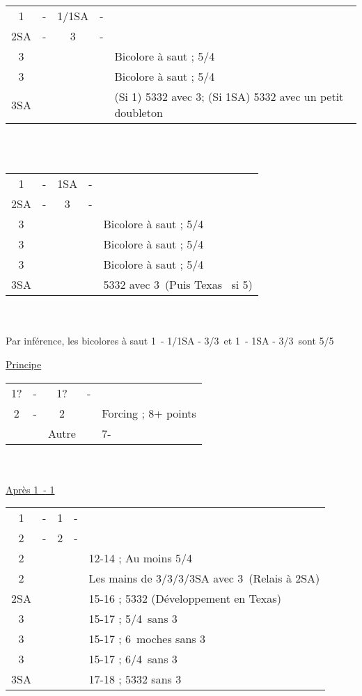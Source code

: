 \documentclass[a4paper, oneside, 11pt]{report}
\begin{document}
		\begin{tabular}{cccc|l}
		1\coeur & - & 1\pique/1SA & - &\\
		2SA & - & 3\trefle & - &\\
		3\carreau &&&& Bicolore à saut ; 5\coeur/4\carreau\\
		3\coeur &&&& Bicolore à saut ; 5\coeur/4\trefle\\
		3SA &&&& (Si 1\pique) 5332 avec 3\pique ; (Si 1SA) 5332 avec un petit doubleton \pique\\
		\end{tabular}\\\\
		
		\begin{tabular}{cccc|l}
		1\pique & - & 1SA & - &\\
		2SA & - & 3\trefle & - &\\
		3\carreau &&&& Bicolore à saut ; 5\pique/4\carreau\\
		3\coeur &&&& Bicolore à saut ; 5\pique/4\coeur\\
		3\pique &&&& Bicolore à saut ; 5\pique/4\trefle\\
		3SA &&&& 5332 avec 3\coeur\ (Puis Texas \coeur\ si 5\coeur)\\
		\end{tabular}\\\\

		Par inférence, les bicolores à saut 1\coeur\ - 1\pique/1SA - 3\trefle/3\carreau\ et 1\pique\ - 1SA - 3\carreau/3\coeur\ sont 5/5
		
\newpage
		\underline{Principe}
		
		\begin{tabular}{cccc|l}
		1? & - & 1? & - &\\
		2\trefle & - & 2\carreau && Forcing ; 8+ points\\
		&& Autre && 7-\\
		\end{tabular}\\\\
		
		\underline{Après 1\coeur\ - 1\pique}

		\begin{tabular}{cccc|l}
		1\coeur & - & 1\pique & - &\\
		2\trefle & - & 2\carreau & - &\\
		2\coeur &&&& 12-14 ; Au moins 5\coeur/4\trefle\\
		2\pique &&&& Les mains de 3\trefle/3\carreau/3\coeur/3SA avec 3\pique\ (Relais à 2SA)\\
		2SA &&&& 15-16 ; 5332 (Développement en Texas)\\
		3\trefle &&&& 15-17 ; 5\coeur/4\trefle\ sans 3\pique\\
		3\carreau &&&& 15-17 ; 6\coeur\ moches sans 3\pique\\
		3\coeur &&&& 15-17 ; 6\coeur/4\trefle\ sans 3\pique\\
		3SA &&&& 17-18 ; 5332 sans 3\pique\\
		\end{tabular}\\\\
\end{document}
